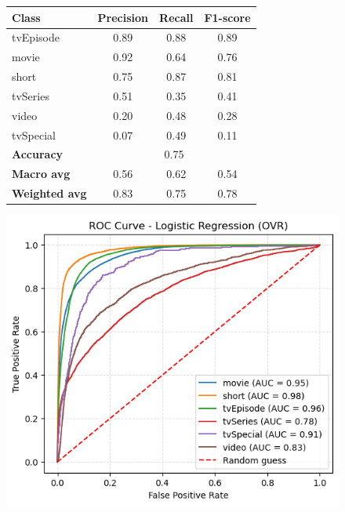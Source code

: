 \begin{figure}[ht]
    \centering
    \begin{minipage}{0.45\textwidth} %
    \centering
    \label{tab:logistic_report_t}
    \small %
    \begin{tabular}{lccc}
    \hline
    \textbf{Class} & \textbf{Precision} & \textbf{Recall} & \textbf{F1-score}\\
    \hline
    tvEpisode  & 0.89 & 0.88 & 0.89  \\
    movie      & 0.92 & 0.64 & 0.76  \\
    short      & 0.75 & 0.87 & 0.81  \\
    tvSeries   & 0.51 & 0.35 & 0.41  \\
    video      & 0.20 & 0.48 & 0.28  \\
    tvSpecial  & 0.07 & 0.49 & 0.11  \\
    \hline
    \textbf{Accuracy}    & \multicolumn{3}{c}{0.75} \\
    \textbf{Macro avg}   & 0.56 & 0.62 & 0.54  \\
    \textbf{Weighted avg}& 0.83 & 0.75 & 0.78  \\
    \hline
    \end{tabular}
    \end{minipage}
    \hfill
    \begin{minipage}{0.4\textwidth} 
    \centering
    \includegraphics[width=\textwidth]{plotsss/log_roc_curves_t.png} 
    \label{fig:log_roc_curves_t} 
    \end{minipage}
    \end{figure}


